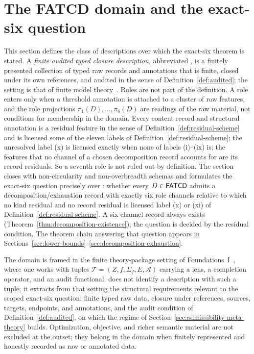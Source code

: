 \section{The FATCD domain and the exact-six question}\label{sec:fatcd-domain}


This section defines the class of descriptions over which the
exact-six theorem is stated. A \emph{finite audited typed closure
description}, abbreviated \FATCD{}, is a finitely presented collection
of typed raw records and annotations that is finite, closed under its
own references, and audited in the sense of Definition~\ref{def:audited}; the setting is that of finite
model theory~\citep{Libkin2004}. Roles are not part of the definition.
A role enters only when a threshold annotation is attached to a cluster
of raw features, and the role projections \(\pi_1(D),\dots,\pi_6(D)\)
are readings of the raw material, not conditions for membership in the
domain. Every content record and structural annotation is a
residual feature in the sense of Definition~\ref{def:residual-scheme} and
is licensed some of the eleven labels of Definition~\ref{def:residual-scheme}; the unresolved label (x) is licensed exactly when none of labels (i)--(ix) is; the features
that no channel of a chosen decomposition record accounts for are its record
residuals. So a seventh role is not ruled out by definition. The section closes with
non-circularity and non-overbreadth schemas and formulates the
exact-six question precisely over \FATCD{}: whether every
\(D \in \mathsf{FATCD}{}\) admits a decomposition/exhaustion record with
exactly six role channels relative to which no kind residual and no record residual is licensed
label (x) or (xi) of Definition~\ref{def:residual-scheme}. A six-channel record
always exists (Theorem~\ref{thm:decomposition-existence}); the question is
decided by the residual condition. The theorem chain answering that question
appears in
Sections~\ref{sec:lower-bounds}--\ref{sec:decomposition-exhaustion}.

The domain is framed in the finite theory-package setting of
Foundations~I~\citep{Tsiokos2026SixBirdsFoundations}, where one works
with tuples \(\mathcal{T} = (Z, f, \Sigma_f, E, \mathcal{A})\)
carrying a lens, a completion operator, and an audit functional. \FATCD{} does not
identify a description with such a tuple; it extracts from that
setting the structural requirements relevant to the scoped exact-six
question: finite typed raw data, closure under references, sources,
targets, endpoints, and annotations, and the audit condition of
Definition~\ref{def:audited}, on which the regime of
Section~\ref{sec:admissibility-meta-theory} builds. Optimization,
objective, and richer semantic material are not excluded at the
outset; they belong in the domain when finitely represented and
honestly recorded as raw or annotated data.

